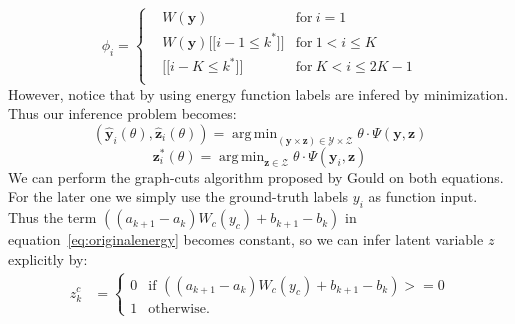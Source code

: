 \documentclass{article}
\DeclareMathOperator*{\argmin}{arg\,min}
\begin{document}
		\begin{equation}
		\phi_i = \left\{
		\begin{aligned}
		& W(\mathbf{y}) 	& \text{for} \ i=1\\
		& W(\mathbf{y})\bigg[\bigg[i-1\le k^*\bigg]\bigg] & \text{for}\ 1<i\le K\\
		& \bigg[\bigg[ i-K\le k^*\bigg]\bigg]  & \text{for} \ K<i\le2K-1\\
		\end{aligned}
		\right.
		\end{equation}
		However, notice that by using energy function labels are infered by minimization. Thus our inference problem becomes:
		$$
		(\mathbf{\hat{y}}_i(\theta),\mathbf{\hat{z}}_i(\theta))=\argmin_{(\mathbf{y} \times \mathbf{z}) \in \mathcal{Y} \times \mathcal{Z}} \theta\cdot\Psi(\mathbf{y},\mathbf{z})
		$$
		$$
		\mathbf{z}^*_i(\theta) = \argmin_{\mathbf{z} \in \mathcal{Z}} \theta \cdot \Psi(\mathbf{y}_i,\mathbf{z})
		$$
		We can perform the graph-cuts algorithm proposed by Gould\cite{gouldlearning} on both equations. For the later one we simply use the ground-truth labels $y_i$ as function input. Thus the term $((a_{k+1}-a_k)W_c(y_c)+b_{k+1}-b_k)$ in equation~\ref{eq:originalenergy} becomes constant, so we can infer latent variable $z$ explicitly by:
		\begin{align}
		\label{eq:inferlatent}
		z_k^c &=
		\begin{cases}
		0 & \text{if $((a_{k+1}-a_k)W_c(y_c)+b_{k+1}-b_k)>=0$} \\
		1 & \text{otherwise}.
		\end{cases}
		\end{align}
		
\end{document}

